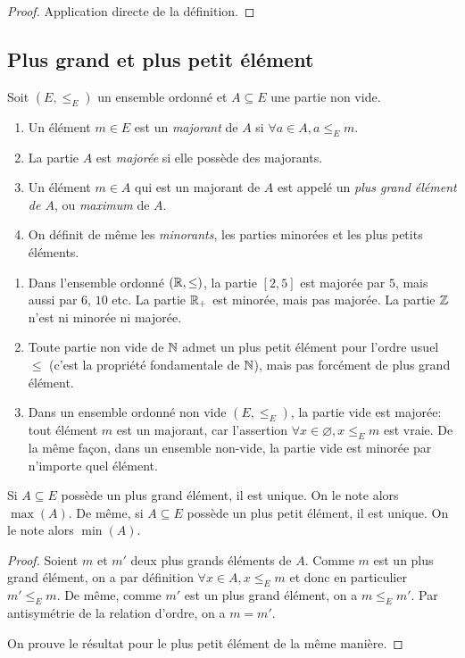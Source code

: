 \begin{proof}
Application directe de la définition.
\end{proof}

\subsection{Plus grand et plus petit élément}
\begin{definition}
Soit $(E,\leq_E)$ un ensemble ordonné et $A\subseteq E$ une partie non vide.
\begin{enumerate}
\item Un élément $m\in E$ est un \emph{majorant} de $A$ si $\forall a\in A, a\leq_E m$.
\item La partie $A$ est \emph{majorée} si elle possède des majorants.
\item Un élément $m\in A$ qui est un majorant de $A$ est appelé un \emph{plus grand élément de $A$}, ou \emph{maximum} de $A$.
\item On définit de même les \emph{minorants}, les parties minorées et les plus petits éléments.
\end{enumerate}
\end{definition}

\begin{exemple}
\begin{enumerate}[label=\alph*)]
\item Dans l'ensemble ordonné $(\mathbb{R},\leq)$, la partie $[2,5]$ est majorée par $5$, mais aussi par $6$, $10$ etc. La partie $\mathbb{R}_+$ est minorée, mais pas majorée. La partie $\mathbb{Z}$ n'est ni minorée ni majorée.
\item Toute partie non vide de $\mathbb{N}$ admet un plus petit élément pour l'ordre usuel $\leq$ (c'est la propriété fondamentale de $\mathbb{N}$), mais pas forcément de plus grand élément.
\item Dans un ensemble ordonné non vide $(E,\leq_E)$, la partie vide est majorée: tout élément $m$ est un majorant, car l'assertion $\forall x\in \varnothing, x\leq_E m$ est vraie. De la même façon, dans un ensemble non-vide, la partie vide est minorée par n'importe quel élément.
\end{enumerate}
\end{exemple}



\begin{proposition}
Si $A\subseteq E$ possède un plus grand élément, il est unique. On le note alors $\max(A)$.
De même, si $A\subseteq E$ possède un plus petit élément, il est unique. On le note alors $\min(A)$.
\end{proposition}
\begin{proof}
Soient $m$ et $m'$ deux plus grands éléments de $A$. Comme $m$ est un plus grand élément, on a par définition $\forall x\in A, x\leq_E m$ et donc en particulier $m'\leq_E m$. De même, comme $m'$ est un plus grand élément, on a $m\leq_E m'$. Par antisymétrie de la relation d'ordre, on a $m=m'$.

On prouve le résultat pour le plus petit élément de la même manière.
\end{proof}


